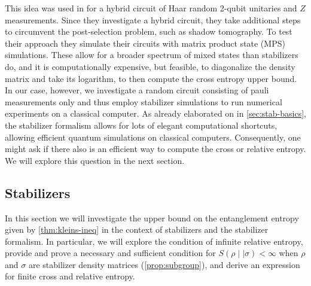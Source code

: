 This idea was used in \cite{garrattProbingPostmeasurementEntanglement2024} for
a hybrid circuit of Haar random 2-qubit unitaries and $Z$ measurements. Since
they investigate a hybrid circuit, they take additional steps to circumvent the
post-selection problem, such as shadow tomography. To test their approach they
simulate their circuits with matrix product state (MPS) simulations. These
allow for a broader spectrum of mixed states than stabilizers do, and it is
computationally expensive, but feasible, to diagonalize the density matrix and
take its logarithm, to then compute the cross entropy upper bound. In our case,
however, we investigate a random circuit consisting of pauli measurements only
and thus employ stabilizer simulations to run numerical experiments on a
classical computer. As already elaborated on in \cref{sec:stab-basics},
the stabilizer formalism allows for lots of elegant computational shortcuts,
allowing efficient quantum simulations on classical computers. Consequently,
one might ask if there also is an efficient way to compute the cross or
relative entropy. We will explore this question in the next section.



\subsection{Stabilizers}\label{sec:rel-ent-stab}
In this section we will investigate the upper bound on the entanglement entropy
given by \cref{thm:kleins-ineq} in the context of stabilizers and the
stabilizer formalism. In particular, we will explore the condition of infinite
relative entropy,
provide and prove a necessary and sufficient condition
for $S(\rho\mid\mid\sigma)<\infty$ when $\rho$ and $\sigma$ are stabilizer
density matrices (\cref{prop:subgroup}), and derive an expression for finite cross
and relative entropy.

